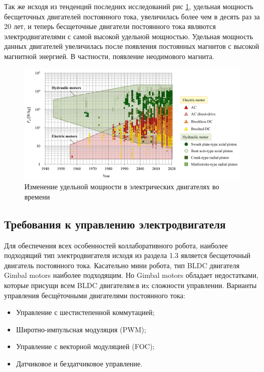 Так же исходя из тенденций последних исследований \citep{Sakama2022} рис \ref{magnets}, удельная мощность бесщеточных двигателей постоянного тока, увеличилась более чем в десять раз за 20 лет, и теперь бесщеточные двигатели постоянного тока являются электродвигателями с самой высокой удельной мощностью. Удельная мощность данных двигателей увеличилась после появления постоянных магнитов с высокой магнитной энергией. В частности, появление неодимового магнита.

\begin{figure}[H]
	\centering
	\includegraphics[width=\textwidth]{Src/images/magnets.png}
	\caption{Изменение удельной мощности в электрических двигателях во времени \citep{Sakama2022}}
	\label{magnets}
\end{figure}

\subsection{Требования к управлению электродвигателя}

Для обеспечения всех особенностей коллаборативного робота, наиболее подходящий тип электродвигателя исходя из раздела 1.3 является бесщеточный двигатель постоянного тока. Касательно мини робота, тип BLDC двигателя Gimbal motors наиболее подходящим. Но Gimbal motors обладает недостатками, которые присущи всем BLDC двигателям:в иx сложности управлении. 
Варианты управления бесщёточными двигателями постоянного тока:
\begin{itemize}
	\item Управление с шестистепенной коммутацией;
	\item Широтно-импульсная модуляция (PWM);
	\item Управление с векторной модуляцией (FOC);
	\item Датчиковое и бездатчиковое управление.
\end{itemize}

